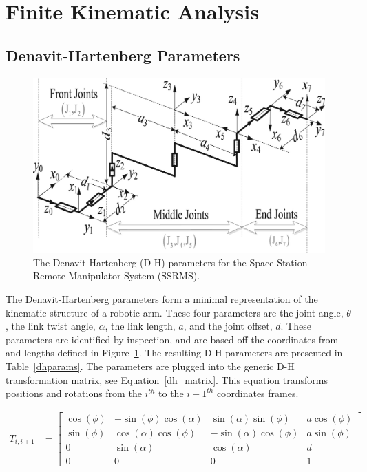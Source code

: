 \documentclass{article}
\begin{document}
\section{Finite Kinematic Analysis}
\subsection{Denavit-Hartenberg Parameters}
\begin{figure}[b]
\includegraphics[width=\textwidth]{dh.jpg}
\caption{The Denavit-Hartenberg (D-H) parameters for the Space Station Remote Manipulator System (SSRMS).}
\label{dh_params}
\end{figure}

The Denavit-Hartenberg parameters form a minimal representation of the kinematic structure of a robotic arm.
These four parameters are the joint angle, $\theta$, the link twist angle, $\alpha$, the link length, $a$, and the joint offset, $d$.
These parameters are identified by inspection, and are based off the coordinates from and lengths defined in Figure~\ref{dh_params}.
The resulting D-H parameters are presented in Table~\ref{dhparams}.
The parameters are plugged into the generic D-H transformation matrix, see Equation~\ref{dh_matrix}.
This equation transforms positions and rotations from the $i^{th}$ to the $i+1^{th}$ coordinates frames.

\begin{align}
T_{i, i+1} &=
\left[\begin{matrix}
\cos{\left (\phi \right )} & - \sin{\left (\phi \right )} \cos{\left (\alpha \right )} & \sin{\left (\alpha \right )} \sin{\left (\phi \right )} & a \cos{\left (\phi \right )}\\
\sin{\left (\phi \right )} & \cos{\left (\alpha \right )} \cos{\left (\phi \right )} & - \sin{\left (\alpha \right )} \cos{\left (\phi \right )} & a \sin{\left (\phi \right )}\\
0 & \sin{\left (\alpha \right )} & \cos{\left (\alpha \right )} & d\\
0 & 0 & 0 & 1
\end{matrix}\right]
\label{dh_matrix}
\end{align}
\end{document}
